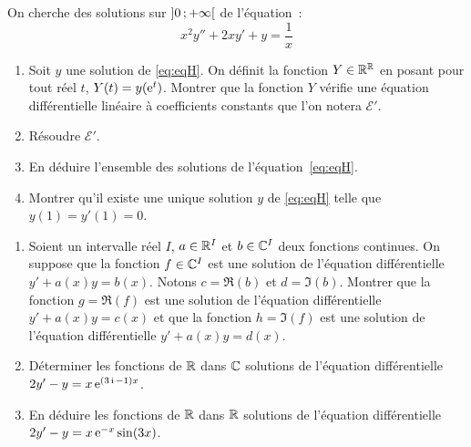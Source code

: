 \begin{exercice}    
    On cherche des solutions sur \(\left] 0 \, ;  +\infty \right[\) de l'équation~:
    \begin{equation}
        \label{eq:eqH}
        x^2y'' + 2xy' + y = \frac{1}{x}
    \end{equation}
    \begin{enumerate}
        \item Soit \(y\) une solution de \eqref{eq:eqH}. On définit la fonction \(Y \in \mathbb{R}^{\mathbb{R}}\) en posant pour tout réel \(t\), \(Y(t) = y(\operatorname{e}^t)\). Montrer que la fonction \(Y\) vérifie une équation différentielle linéaire à coefficients constants que l'on notera \(\mathcal{E}'\).
        \item Résoudre \(\mathcal{E}'\). 
        \item En déduire l'ensemble des solutions de l'équation~\eqref{eq:eqH}.
        \item Montrer qu'il existe une unique solution \(y\) de \eqref{eq:eqH} telle que \(y(1)=y'(1)=0\).
    \end{enumerate}
\end{exercice}
\begin{exercice}
    \begin{enumerate}
        \item Soient un intervalle réel \(I\), \(a \in \mathbb{R}^I\) et \(b \in \mathbb{C}^I\) deux fonctions continues. On suppose que la fonction \(f \in \mathbb{C}^I\) est une solution de l'équation différentielle \(y' + a(x)y = b(x)\). Notons \(c = \Re(b)\) et \(d = \Im(b)\). Montrer que la fonction \(g = \Re(f)\) est une solution de l'équation différentielle \(y' + a(x)y = c(x)\) et que la fonction \(h = \Im(f)\) est une solution de l'équation différentielle \(y' + a(x)y = d(x)\).
        \item Déterminer les fonctions de \(\mathbb{R}\) dans \(\mathbb{C}\) solutions de l'équation différentielle \(2y'-y = x\operatorname{e}^{(3\operatorname{i}-1)x}\).
        \item En déduire les fonctions de \(\mathbb{R}\) dans \(\mathbb{R}\) solutions de l'équation différentielle \(2y'-y = x\operatorname{e}^{-x}\sin(3x)\).
    \end{enumerate}
\end{exercice}
